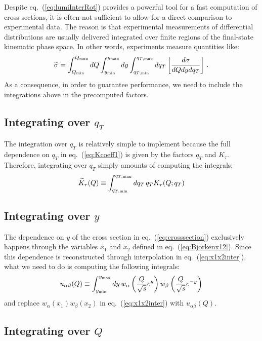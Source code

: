 \documentclass[10pt,a4paper]{article}
\begin{document}
Despite eq.~(\ref{eq:lumiInterRot}) provides a powerful tool for a
fast computation of cross sections, it is often not sufficient to
allow for a direct comparison to experimental data. The reason is that
experimental measurements of differential distributions are usually
delivered integrated over finite regions of the final-state kinematic
phase space. In other words, experiments measure quantities like:
\begin{equation}\label{eq:Intcrosssection}
\widetilde{\sigma}=\int_{Q_{\rm min}}^{Q_{\rm max}}dQ \int_{y_{\rm min}}^{y_{\rm max}}dy \int_{q_{T,\rm min}}^{q_{T,\rm max}}dq_T\left[\frac{d\sigma}{dQ dy dq_T} \right]\,.
\end{equation}
As a consequence, in order to guarantee performance, we need to
include the integrations above in the precomputed factors.

\subsection{Integrating over $q_T$}

The integration over $q_T$ is relatively simple to implement because
the full dependence on $q_T$ in eq.~(\ref{eq:Kcoeff1}) is given by the
factors $q_T$ and $K_\tau$. Therefore, integrating over $q_T$ simply
amounts of computing the integrals:
\begin{equation}\label{eq:KcoeffInt}
  \widetilde{K}_\tau(Q)\equiv \int_{q_{T,\rm min}}^{q_{T,\rm max}}dq_T\,q_TK_\tau(Q;q_T)
\end{equation}

\subsection{Integrating over $y$}

The dependence on $y$ of the cross section in
eq.~(\ref{eq:crosssection}) exclusively happens through the variables
$x_1$ and $x_2$ defined in eq.~(\ref{eq:Bjorkenx12}). Since this
dependence is reconstructed through interpolation in
eq.~(\ref{eq:x1x2inter}), what we need to do is computing the
following integrals:
\begin{equation}
u_{\alpha\beta}(Q)\equiv \int_{y_{\rm min}}^{y_{\rm max}}dy\,w_\alpha\left(\frac{Q}{\sqrt{s}}e^y\right)w_\beta\left(\frac{Q}{\sqrt{s}}e^{-y}\right)
\end{equation}
and replace $w_\alpha(x_1)w_\beta(x_2)$ in eq.~(\ref{eq:x1x2inter})
with $u_{\alpha\beta}(Q)$.

\subsection{Integrating over $Q$}
\end{document}
